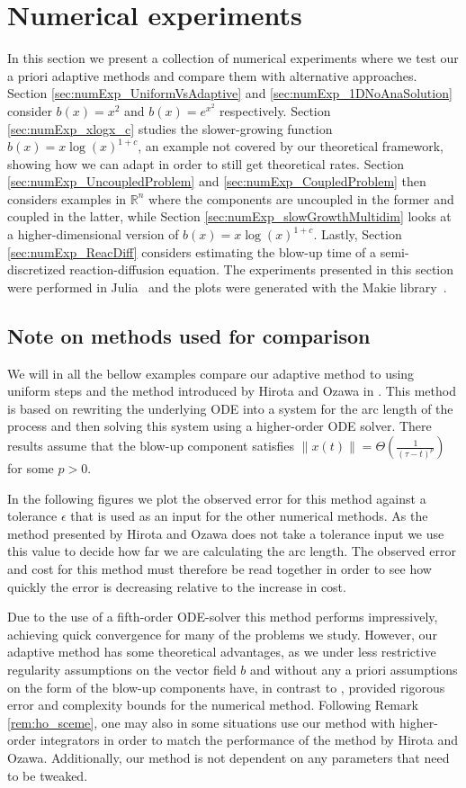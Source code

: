 \documentclass[a4paper, oneside, reqno]{amsart}
\newcommand{\norm}[1]{\left\|#1\right\|}
\newcommand{\R}{\mathbb{R}}
\theoremstyle{remark}
\begin{document}
\section{Numerical experiments}
\label{sec:numExp}
In this section we present a collection of numerical experiments where we test our a priori adaptive methods and compare them with alternative approaches.
Section \ref{sec:numExp_UniformVsAdaptive} and \ref{sec:numExp_1DNoAnaSolution} consider \(b(x) = x^2\) and \(b(x) = e^{x^2}\) respectively.  
Section \ref{sec:numExp_xlogx_c} studies the slower-growing function \(b(x) = x\log(x)^{1+c}\), an example not covered by our theoretical framework, showing how we can adapt in order to still get theoretical rates. 
Section \ref{sec:numExp_UncoupledProblem} and \ref{sec:numExp_CoupledProblem} then considers examples in \(\R^n\) where the components are uncoupled in the former and coupled in the latter, while Section \ref{sec:numExp_slowGrowthMultidim} looks at a higher-dimensional version of \(b(x) = x\log(x)^{1+c}\).
Lastly, Section \ref{sec:numExp_ReacDiff} considers estimating the blow-up time of a semi-discretized reaction-diffusion equation. 
The experiments presented in this section were performed in Julia~\cite{Bezanson2017} and the plots were generated with the Makie library~\cite{Danisch2021}.

\subsection{Note on methods used for comparison}
We will in all the bellow examples compare our adaptive method to using uniform steps and the method introduced by Hirota and Ozawa in \cite{Hirota2006}. 
This method is based on rewriting the underlying ODE into a system for the arc length of the process and then solving this system using a higher-order ODE solver. 
There results assume that the blow-up component satisfies \(\norm{x(t)} = \Theta\left(\frac{1}{(\tau-t)^p}\right)\) for some \(p > 0\). 

In the following figures we plot the observed error for this method against a tolerance \(\epsilon\) that is used as an input for the other numerical methods. 
As the method presented by Hirota and Ozawa does not take a tolerance input we use this value to decide how far we are calculating the arc length. 
The observed error and cost for this method must therefore be read together in order to see how quickly the error is decreasing relative to the increase in cost. 

Due to the use of a fifth-order ODE-solver this method performs impressively, achieving quick convergence for many of the problems we study. However, our adaptive method has some theoretical advantages, as we under less restrictive regularity assumptions on the vector field \(b\) and without any a priori assumptions on the form of the blow-up components have, in contrast to \cite{Hirota2006}, provided rigorous error and complexity bounds for the numerical method. 
Following Remark \ref{rem:ho_sceme}, one may also in some situations use our method with higher-order integrators in order to match the performance of the method by Hirota and Ozawa.
Additionally, our method is not dependent on any parameters that need to be tweaked.
\end{document}
